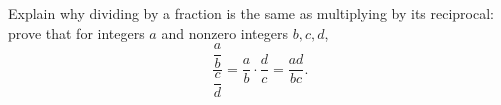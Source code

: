 Explain why dividing by a fraction is the same as multiplying by its reciprocal: prove that for integers $a$ and nonzero integers $b,c,d$,
\[\dfrac{\dfrac ab}{\dfrac cd}=\dfrac ab\cdot\dfrac dc=\dfrac{ad}{bc}.\]
